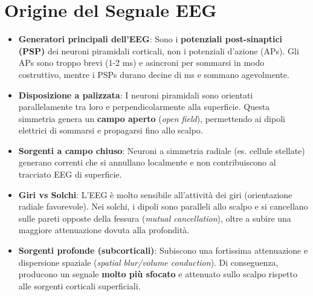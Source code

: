 \documentclass[10pt, letterpaper]{report}
\begin{document}
\section{Origine del Segnale EEG}
\begin{itemize}
    \item \textbf{Generatori principali dell'EEG}: Sono i \textbf{potenziali post-sinaptici (PSP)} dei neuroni piramidali corticali, non i potenziali d'azione (APs). Gli APs sono troppo brevi (1-2 ms) e asincroni per sommarsi in modo costruttivo, mentre i PSPs durano decine di ms e sommano agevolmente.
    \item \textbf{Disposizione a palizzata}: I neuroni piramidali sono orientati parallelamente tra loro e perpendicolarmente alla superficie. Questa simmetria genera un \textbf{campo aperto} (\emph{open field}), permettendo ai dipoli elettrici di sommarsi e propagarsi fino allo scalpo.
    \item \textbf{Sorgenti a campo chiuso}: Neuroni a simmetria radiale (es. cellule stellate) generano correnti che si annullano localmente e non contribuiscono al tracciato EEG di superficie.
    \item \textbf{Giri vs Solchi}: L'EEG è molto sensibile all'attività dei giri (orientazione radiale favorevole). Nei solchi, i dipoli sono paralleli allo scalpo e si cancellano sulle pareti opposte della fessura (\emph{mutual cancellation}), oltre a subire una maggiore attenuazione dovuta alla profondità.
    \item \textbf{Sorgenti profonde (subcorticali)}: Subiscono una fortissima attenuazione e dispersione spaziale (\emph{spatial blur/volume conduction}). Di conseguenza, producono un segnale \textbf{molto più sfocato} e attenuato sullo scalpo rispetto alle sorgenti corticali superficiali.
\end{itemize}
\end{document}
